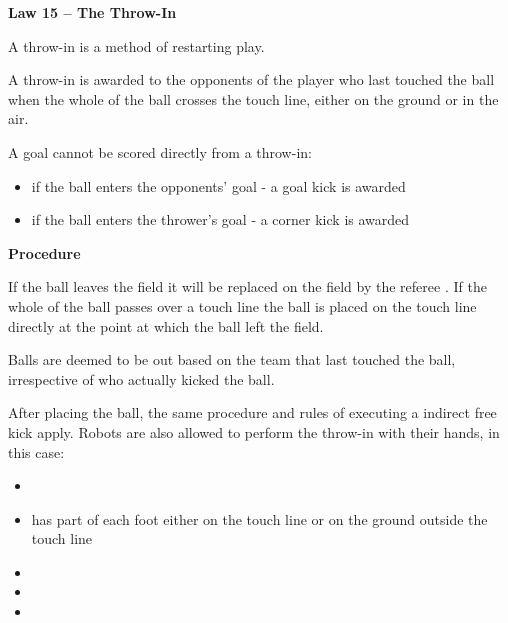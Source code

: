 \clearpage
\sffamily
{\bfseries
\textcolor[rgb]{0.4,0.4,0.4}{Law 15 -- The Throw-In} }
{}


\bigskip

A throw-in is a method of restarting play.

\bigskip

A throw-in is awarded to the opponents of the player who last touched the ball when the whole of the ball crosses the touch line, either on the ground or in the air.


\bigskip

A goal cannot be scored directly from a throw-in:
\begin{itemize}
\item if the ball enters the opponents' goal - a goal kick is awarded
\item if the ball enters the thrower's goal - a corner kick is awarded
\end{itemize}

\bigskip

{\bfseries Procedure }

\headlinebox 

If the ball leaves the field it will be replaced on the field by the referee .
If the whole of the ball passes over a touch line the ball is placed on the
touch line directly at the point at which the ball left the field.

\bigskip

Balls are deemed to be out based on the team that last touched the ball,
irrespective of who actually kicked the ball.

\bigskip

After placing the ball, the same procedure and rules of executing a indirect free kick apply.
Robots are also allowed to perform the throw-in with their hands, in this case:

\begin{itemize}
\item {}
\item has part of each foot either on the touch line or on the ground outside
      the touch line
\item {}
\item {}
\item {}
\end{itemize}

